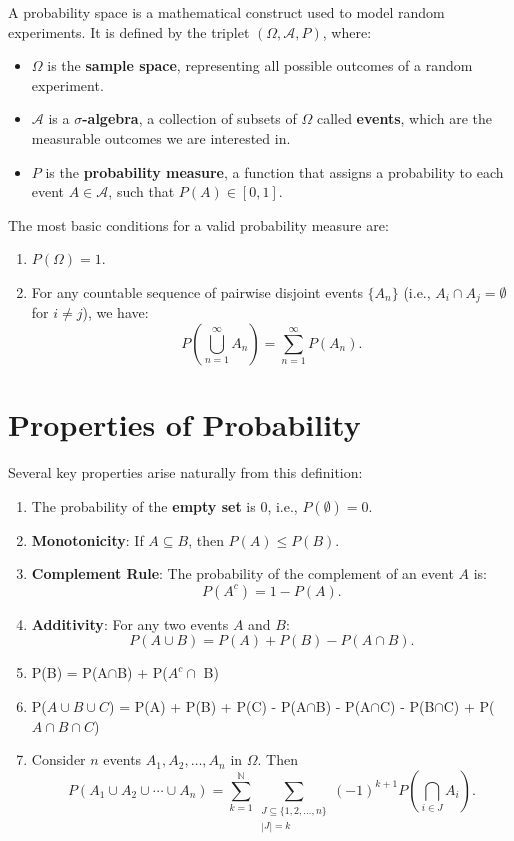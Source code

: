 A probability space is a mathematical construct used to model random experiments. It is defined by the triplet $(\Omega, \mathcal{A}, P)$, where:
    \begin{itemize}
        \item $\Omega$ is the \textbf{sample space}, representing all possible outcomes of a random experiment.
        \item $\mathcal{A}$ is a \textbf{$\sigma$-algebra}, a collection of subsets of $\Omega$ called \textbf{events}, which are the measurable outcomes we are interested in.
        \item $P$ is the \textbf{probability measure}, a function that assigns a probability to each event $A \in \mathcal{A}$, such that $P(A) \in [0, 1]$.
    \end{itemize}
    The most basic conditions for a valid probability measure are:
    \begin{enumerate}
        \item $P(\Omega) = 1$.
        \item For any countable sequence of pairwise disjoint events $\{A_n\}$ (i.e., $A_i \cap A_j = \emptyset$ for $i \neq j$), we have:
        \[
        P\left( \bigcup_{n=1}^{\infty} A_n \right) = \sum_{n=1}^{\infty} P(A_n).
        \]
    \end{enumerate}
    
    \section{Properties of Probability}
    Several key properties arise naturally from this definition:
    \begin{enumerate}
        \item The probability of the \textbf{empty set} is 0, i.e., $P(\emptyset) = 0$.
        \item \textbf{Monotonicity}: If $A \subseteq B$, then $P(A) \leq P(B)$.
        \item \textbf{Complement Rule}: The probability of the complement of an event $A$ is:
        \[
        P(A^c) = 1 - P(A).
        \]
        \item \textbf{Additivity}: For any two events $A$ and $B$:
        \[
        P(A \cup B) = P(A) + P(B) - P(A \cap B).
        \]
        \item P(B) = P(A$\cap$B) + P($A^c\cap$ B)
        \item P($A\cup B \cup C$) = P(A) + P(B) + P(C) - P(A$\cap$B) - P(A$\cap$C) - P(B$\cap$C) + P($A\cap B \cap C$)
        \item Consider $n$ events $A_1, A_2, \dots, A_n$ in $\Omega$. Then 
        \[
        {P}(A_1 \cup A_2 \cup \cdots \cup A_n) = \sum_{k=1}^\mathbb{N} \sum_{\substack{J \subseteq \{1,2,\dots,n\} \\ |J| = k}} (-1)^{k+1} {P}\left(\bigcap_{i \in J} A_i\right).
        \]
    \end{enumerate}
    
